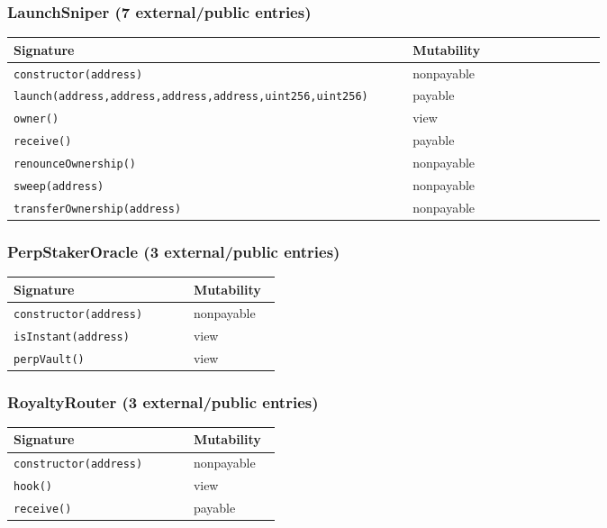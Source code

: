 \subsubsection*{LaunchSniper \;\normalfont\small(7 external/public entries)}
\begin{longtable}{@{}p{0.62\linewidth}p{0.30\linewidth}@{}}
\toprule \textbf{Signature} & \textbf{Mutability} \\ \midrule \endhead
\texttt{\scriptsize constructor(address)} & nonpayable \\
\texttt{\scriptsize launch(address,address,address,address,uint256,uint256)} & payable \\
\texttt{\scriptsize owner()} & view \\
\texttt{\scriptsize receive()} & payable \\
\texttt{\scriptsize renounceOwnership()} & nonpayable \\
\texttt{\scriptsize sweep(address)} & nonpayable \\
\texttt{\scriptsize transferOwnership(address)} & nonpayable \\
\bottomrule\end{longtable}

\subsubsection*{PerpStakerOracle \;\normalfont\small(3 external/public entries)}
\begin{longtable}{@{}p{0.62\linewidth}p{0.30\linewidth}@{}}
\toprule \textbf{Signature} & \textbf{Mutability} \\ \midrule \endhead
\texttt{\scriptsize constructor(address)} & nonpayable \\
\texttt{\scriptsize isInstant(address)} & view \\
\texttt{\scriptsize perpVault()} & view \\
\bottomrule\end{longtable}

\subsubsection*{RoyaltyRouter \;\normalfont\small(3 external/public entries)}
\begin{longtable}{@{}p{0.62\linewidth}p{0.30\linewidth}@{}}
\toprule \textbf{Signature} & \textbf{Mutability} \\ \midrule \endhead
\texttt{\scriptsize constructor(address)} & nonpayable \\
\texttt{\scriptsize hook()} & view \\
\texttt{\scriptsize receive()} & payable \\
\bottomrule\end{longtable}

